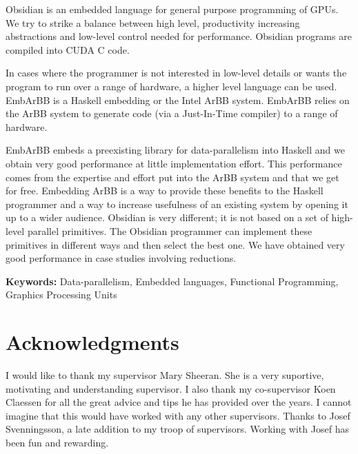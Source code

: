 \documentclass[a4paper]{book}
\begin{document}
Obsidian is an embedded language for general purpose programming of GPUs. We try to strike 
a balance between high level, productivity increasing abstractions and low-level 
control needed for performance. Obsidian programs are compiled into CUDA C code. 

In cases where the programmer is not interested in low-level details 
or wants the program to run over a range of hardware, a higher level language can be used.
EmbArBB is a Haskell embedding or the Intel ArBB system. EmbArBB relies on the ArBB system 
to generate code (via a Just-In-Time compiler) to a range of hardware. 

EmbArBB embeds a preexisting library for data-parallelism into Haskell and we obtain 
very good performance at little implementation effort. This performance comes from the 
expertise and effort put into the ArBB system and that we get for free. Embedding ArBB is 
a way to provide these benefits to the Haskell programmer and a way to increase usefulness
of an existing system by opening it up to a wider audience. Obsidian is very different; it 
is not based on a set of high-level parallel primitives. The Obsidian programmer 
can implement these primitives in different ways and then select the best one. 
We have obtained very good performance in case studies involving reductions. 
 
\vspace{5mm}

\noindent

\textbf{Keywords:} Data-parallelism, Embedded languages, Functional Programming, Graphics Processing Units

\clearpage

\section*{Acknowledgments}

I would like to thank my supervisor Mary Sheeran. She is a very suportive, motivating and 
understanding supervisor. I also thank my co-supervisor Koen Claessen for all the great advice 
and tips he has provided over the years. I cannot imagine that this would have worked with 
any other supervisors. Thanks to Josef Svenningsson, a late addition to my troop of 
supervisors. Working with Josef has been fun and rewarding. 
\end{document}
